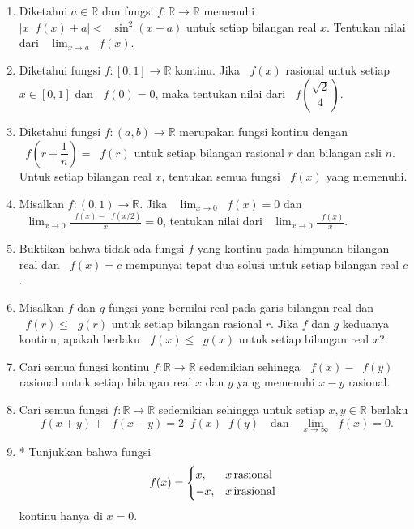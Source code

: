 \documentclass[12pt]{article}
\newcommand*\func[2]{\mathop{}\!{#1}{\left({#2}\right)}}
\newcommand*\ds[1]{\mathop{}\!\displaystyle{{#1}}}
\begin{document}
\begin{enumerate}[leftmargin=*]
		\item Diketahui $ a \in \mathbb{R} $ dan fungsi $ f : \mathbb{R} \to \mathbb{R} $ memenuhi $ \left|x\func{f}{x} + a\right| < \func{\sin^{2}}{x - a} $ untuk setiap bilangan real $ x $. Tentukan nilai dari $ \ds{\lim_{x \to a}{\func{f}{x}}} $.
		\item Diketahui fungsi $ f : \left[0, 1\right] \to \mathbb{R} $ kontinu. Jika $ \func{f}{x} $ rasional untuk setiap $ x \in \left[0, 1\right] $ dan $ \func{f}{0} = 0 $, maka tentukan nilai dari $ \func{f}{\dfrac{\sqrt{2}}{4}} $.
		\item Diketahui fungsi $ f : \left(a, b\right) \to \mathbb{R} $ merupakan fungsi kontinu dengan $ \func{f}{r + \dfrac{1}{n}} = \func{f}{r} $ untuk setiap bilangan rasional $ r $ dan bilangan asli $ n $. Untuk setiap bilangan real $ x $, tentukan semua fungsi $ \func{f}{x} $ yang memenuhi.
		\item Misalkan $ f : \left(0, 1\right) \to \mathbb{R} $. Jika $ \ds{\lim_{x \to 0}{\func{f}{x}}} = 0 $ dan $ \ds{\lim_{x \to 0}{\frac{\func{f}{x} - \func{f}{x/2}}{x}}} = 0 $, tentukan nilai dari $ \ds{\lim_{x \to 0}{\frac{\func{f}{x}}{x}}} $.
		\item Buktikan bahwa tidak ada fungsi $ f $ yang kontinu pada himpunan bilangan real dan $ \func{f}{x} = c $ mempunyai tepat dua solusi untuk setiap bilangan real $ c $.
		\item Misalkan $ f $ dan $ g $ fungsi yang bernilai real pada garis bilangan real dan $ \func{f}{r} \leq \func{g}{r} $ untuk setiap bilangan rasional $ r $. Jika $ f $ dan $ g $ keduanya kontinu, apakah berlaku $ \func{f}{x} \leq \func{g}{x} $ untuk setiap bilangan real $ x $?
		\item Cari semua fungsi kontinu $ f : \mathbb{R} \to \mathbb{R} $ sedemikian sehingga $ \func{f}{x} - \func{f}{y} $ rasional untuk setiap bilangan real $ x $ dan $ y $ yang memenuhi $ x - y $ rasional.
		\item Cari semua fungsi $ f : \mathbb{R} \to \mathbb{R} $ sedemikian sehingga untuk setiap $ x, y \in \mathbb{R} $ berlaku
		\[ \func{f}{x + y} + \func{f}{x - y} = 2\func{f}{x}\func{f}{y} \quad \mbox{dan} \quad \lim_{x \to \infty}{\func{f}{x}} = 0. \]
		\item* Tunjukkan bahwa fungsi
		\[
			\func{f}{x}	=	\begin{cases}
								\hfil x,	& x \, \mbox{rasional} \\
								-x,			& x \, \mbox{irasional}
							\end{cases}
		\]
		kontinu hanya di $ x = 0 $.

\end{enumerate}
\end{document}
